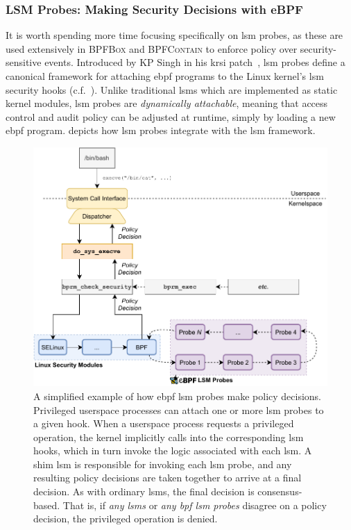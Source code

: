 \documentclass[
  fontsize=12pt,
  titlepage=firstiscover,
  paper=letter,
oneside,
  cleardoublepage=plain,
  parskip=half-,
  DIV=10,
  parindent,
  appendixprefix,
  chapterprefix,
  listof=totoc,
]{scrbook}
\newcommand{\bpfbox}{\textsc{BPFBox}}
\newcommand{\bpfcontain}{\textsc{BPFContain}}
\begin{document}
\subsubsection*{LSM Probes: Making Security Decisions with eBPF}

It is worth spending more time focusing specifically on \gls{lsm} probes, as these are used
extensively in \bpfbox{} and \bpfcontain{} to enforce policy over security-sensitive
events. Introduced by KP Singh in his \gls{krsi}
patch~\cite{singh2019_krsi}, \gls{lsm} probes define a canonical framework for attaching \gls{ebpf}
programs to the Linux kernel's \gls{lsm} security hooks (c.f.\ ). Unlike
traditional \gls{lsm}s which are implemented as static kernel modules, \gls{lsm} probes are
\textit{dynamically attachable}, meaning that access control and audit policy can be adjusted at
runtime, simply by loading a new \gls{ebpf} program.   depicts how \gls{lsm} probes
integrate with the \gls{lsm} framework.

\begin{figure}[htbp]
  \centering
  \includegraphics[width=0.8\linewidth]{figs/background/bpf-lsm.pdf}
  \caption[How eBPF LSM probes make policy decisions]{A simplified example of how \gls{ebpf} \gls{lsm} probes make policy decisions. Privileged userspace processes can attach one or more \gls{lsm} probes to a given hook. When a userspace process requests a privileged operation, the kernel implicitly calls into the corresponding \gls{lsm} hooks, which in turn invoke the logic associated with each \gls{lsm}. A shim \gls{lsm} is responsible for invoking each \gls{lsm} probe, and any resulting policy decisions are taken together to arrive at a final decision. As with ordinary \gls{lsm}s, the final decision is consensus-based. That is, if \textit{any \gls{lsm}s} or \textit{any \gls{bpf} \gls{lsm} probes} disagree on a policy decision, the privileged operation is denied.}\label{fig:bpf-lsm}
\end{figure}
\end{document}
